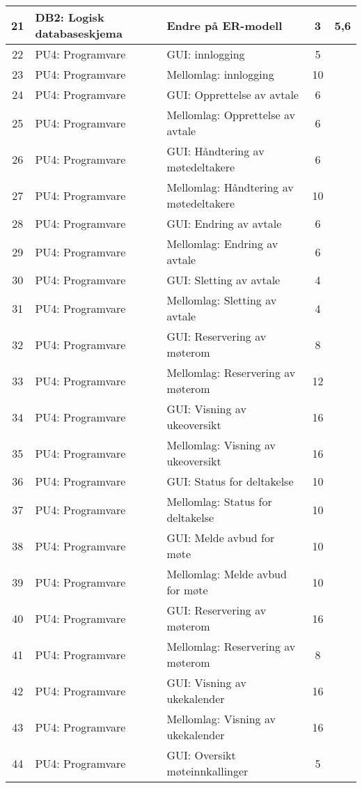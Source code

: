 \begin{longtable}[l]{|c|l|l|c|p{0.7cm}|}
	21 & DB2: Logisk databaseskjema & Endre på ER-modell & 3 & 5,6 \\ \hline
	22 & PU4: Programvare & GUI: innlogging & 5 & \\ \hline
	23 & PU4: Programvare & Mellomlag: innlogging & 10 & \\ \hline
	24 & PU4: Programvare & GUI: Opprettelse av avtale & 6 & \\ \hline
	25 & PU4: Programvare & Mellomlag: Opprettelse av avtale & 6 & \\ \hline
	26 & PU4: Programvare & GUI: Håndtering av møtedeltakere & 6 & \\ \hline
	27 & PU4: Programvare & Mellomlag: Håndtering av møtedeltakere & 10 & \\ \hline
	28 & PU4: Programvare & GUI: Endring av avtale & 6 & \\  \hline
	29 & PU4: Programvare & Mellomlag: Endring av avtale & 6 & \\ \hline
	30 & PU4: Programvare & GUI: Sletting av avtale & 4 & \\ \hline
	31 & PU4: Programvare & Mellomlag: Sletting av avtale & 4 & \\ \hline
	32 & PU4: Programvare & GUI: Reservering av møterom & 8 & \\ \hline
	33 & PU4: Programvare & Mellomlag: Reservering av møterom & 12 & \\ \hline
	34 & PU4: Programvare & GUI: Visning av ukeoversikt & 16 & \\ \hline
	35 & PU4: Programvare & Mellomlag:  Visning av ukeoversikt  & 16 & \\ \hline
	36 & PU4: Programvare & GUI: Status for deltakelse & 10 & \\ \hline
	37 & PU4: Programvare & Mellomlag: Status for deltakelse  & 10 & \\ \hline
	38 & PU4: Programvare & GUI: Melde avbud for møte & 10 & \\ \hline
	39 & PU4: Programvare & Mellomlag: Melde avbud for møte  & 10 & \\ \hline
	40 & PU4: Programvare & GUI: Reservering av møterom & 16 & \\ \hline
	41 & PU4: Programvare & Mellomlag: Reservering av møterom & 8 & \\ \hline
	42 & PU4: Programvare & GUI: Visning av ukekalender & 16 & \\ \hline
	43 & PU4: Programvare & Mellomlag: Visning av ukekalender  & 16 & \\ \hline
	44 & PU4: Programvare & GUI: Oversikt møteinnkallinger & 5 & \\ \hline

\end{longtable}
